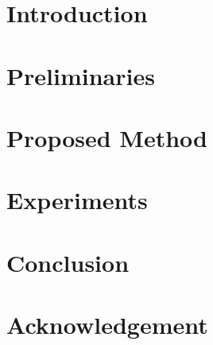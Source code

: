 \documentclass[10pt]{jarticle}
\begin{document}
    

    \maketitle

    

    \section{Introduction}\label{sec:Introduction}
    

    \section{Preliminaries}\label{sec:Preliminaries}
    

    \section{Proposed Method}\label{sec:ProposedMethod}
    


    \section{Experiments}\label{sec:Experiments}
    

    \section{Conclusion}\label{sec:Conclusion}
    


    \section*{Acknowledgement}\label{sec:Acknowledgement}
    

    \begin{spacing}{1}
        \small
        
        
    \end{spacing}
\end{document}

